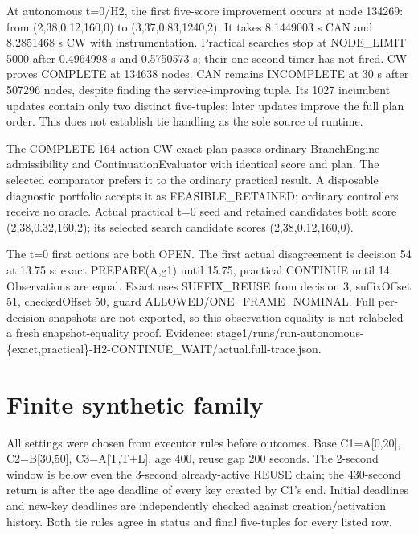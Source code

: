 \documentclass[12pt,a4paper]{article}
\begin{document}
At autonomous t=0/H2, the first five-score improvement occurs at node 134269: from (2,38,0.12,160,0) to (3,37,0.83,1240,2). It takes 8.1449003 s CAN and 8.2851468 s CW with instrumentation. Practical searches stop at NODE\_LIMIT 5000 after 0.4964998 s and 0.5750573 s; their one-second timer has not fired. CW proves COMPLETE at 134638 nodes. CAN remains INCOMPLETE at 30 s after 507296 nodes, despite finding the service-improving tuple. Its 1027 incumbent updates contain only two distinct five-tuples; later updates improve the full plan order. This does not establish tie handling as the sole source of runtime.

The COMPLETE 164-action CW exact plan passes ordinary BranchEngine admissibility and ContinuationEvaluator with identical score and plan. The selected comparator prefers it to the ordinary practical result. A disposable diagnostic portfolio accepts it as FEASIBLE\_RETAINED; ordinary controllers receive no oracle. Actual practical t=0 seed and retained candidates both score (2,38,0.32,160,2); its selected search candidate scores (2,38,0.12,160,0).

The t=0 first actions are both OPEN. The first actual disagreement is decision 54 at 13.75 s: exact PREPARE(A,g1) until 15.75, practical CONTINUE until 14. Observations are equal. Exact uses SUFFIX\_REUSE from decision 3, suffixOffset 51, checkedOffset 50, guard ALLOWED/ONE\_FRAME\_NOMINAL. Full per-decision snapshots are not exported, so this observation equality is not relabeled a fresh snapshot-equality proof. Evidence: stage1/runs/run-autonomous-\{exact,practical\}-H2-CONTINUE\_WAIT/actual.full-trace.json.

\section*{Finite synthetic family}
All settings were chosen from executor rules before outcomes. Base C1=A[0,20], C2=B[30,50], C3=A[T,T+L], age 400, reuse gap 200 seconds. The 2-second window is below even the 3-second already-active REUSE chain; the 430-second return is after the age deadline of every key created by C1's end. Initial deadlines and new-key deadlines are independently checked against creation/activation history. Both tie rules agree in status and final five-tuples for every listed row.
\end{document}

